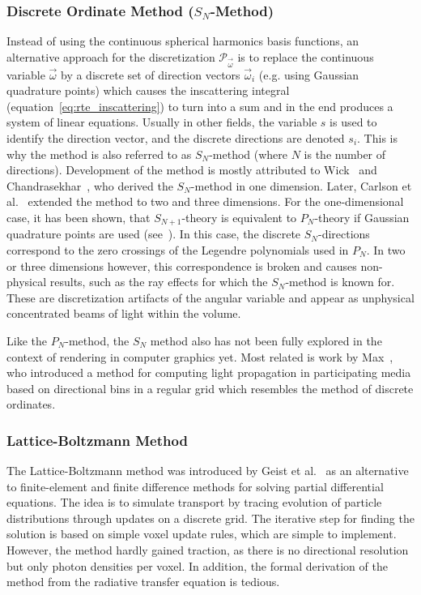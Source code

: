 \subsubsection*{Discrete Ordinate Method ($S_N$-Method)}
Instead of using the continuous spherical harmonics basis functions, an alternative approach for the discretization $\mathcal{P}_{\vec{\omega}}$ is to replace the continuous variable $\vec{\omega}$ by a discrete set of direction vectors $\vec{\omega}_i$ (e.g. using Gaussian quadrature points) which causes the inscattering integral (equation~\ref{eq:rte_inscattering}) to turn into a sum and in the end produces a system of linear equations. Usually in other fields, the variable $s$ is used to identify the direction vector, and the discrete directions are denoted $s_i$. This is why the method is also referred to as $S_N$-method (where $N$ is the number of directions). Development of the method is mostly attributed to Wick~\cite{Wick43} and Chandrasekhar~\cite{Chandrasekhar60}, who derived the $S_N$-method in one dimension. Later, Carlson et al.~\cite{Carlson61} extended the method to two and three dimensions. For the one-dimensional case, it has been shown, that $S_{N+1}$-theory is equivalent to $P_N$-theory if Gaussian quadrature points are used (see~\cite{Cullen01}). In this case, the discrete $S_N$-directions correspond to the zero crossings of the Legendre polynomials used in $P_N$. In two or three dimensions however, this correspondence is broken and causes non-physical results, such as the ray effects for which the $S_N$-method is known for. These are discretization artifacts of the angular variable and appear as unphysical concentrated beams of light within the volume. 

Like the $P_N$-method, the $S_N$ method also has not been fully explored in the context of rendering in computer graphics yet. Most related is work by Max~\cite{Max95}, who introduced a method for computing light propagation in participating media based on directional bins in a regular grid which resembles the method of discrete ordinates.


\subsubsection*{Lattice-Boltzmann Method}

The Lattice-Boltzmann method was introduced by Geist et al.~\cite{Geist04} as an alternative to finite-element and finite difference methods for solving partial differential equations. The idea is to simulate transport by tracing evolution of particle distributions through updates on a discrete grid. The iterative step for finding the solution is based on simple voxel update rules, which are simple to implement. However, the method hardly gained traction, as there is no directional resolution but only photon densities per voxel. In addition, the formal derivation of the method from the radiative transfer equation is tedious.

